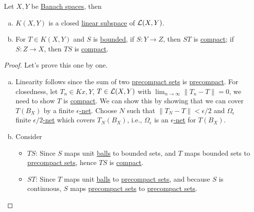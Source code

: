 \begin{proposition}
	Let \(X, Y\) be \hyperref[def:Banach-space]{Banach spaces}, then
	\begin{enumerate}[(a)]
		\item \(K(X, Y)\) is a closed \hyperref[def:linear-vector-space]{linear subspace} of \(\mathcal{\MakeUppercase{l}} (X, Y)\).
		\item For \(T\in K(X, Y)\) and \(S\) is \hyperref[def:bounded-map]{bounded}, if \(S\colon Y\to Z\), then \(ST\) is \hyperref[def:compact-op]{compact}; if \(S\colon Z\to X\), then \(TS\) is \hyperref[def:compact-op]{compact}.
	\end{enumerate}
\end{proposition}
\begin{proof}
	Let's prove this one by one.
	\begin{enumerate}[(a)]
		\item Linearity follows since the sum of two \hyperref[def:precompact]{precompact sets} is \hyperref[def:precompact]{precompact}. For closedness, let \(T_n\in Kx, Y\), \(T\in \mathcal{\MakeUppercase{l}} (X, Y)\) with \(\lim_{n \to \infty} \left\lVert T_n - T\right\rVert = 0\), we need to show \(T\) is \hyperref[def:compact-op]{compact}. We can show this by showing that we can cover \(T(B_X)\) by a finite \hyperref[def:eps-net]{\(\epsilon \)-net}. Choose \(N\) such that \(\left\lVert T_N - T\right\rVert < \epsilon / 2\) and \(\Omega _\epsilon \) finite \hyperref[def:eps-net]{\(\epsilon /2\)-net} which covers \(T_N(B_X)\), i.e., \(\Omega _\epsilon \) is an \hyperref[def:eps-net]{\(\epsilon \)-net} for \(T(B_X)\).
		\item Consider
		      \begin{itemize}
			      \item \(TS\): Since \(S\) maps unit \hyperref[def:ball]{balls} to bounded sets, and \(T\) maps bounded sets to \hyperref[def:precompact]{precompact sets}, hence \(TS\) is \hyperref[def:compact-op]{compact}.
			      \item \(ST\): Since \(T\) maps unit \hyperref[def:ball]{balls} to \hyperref[def:precompact]{precompact sets}, and because \(S\) is continuous, \(S\) maps \hyperref[def:precompact]{precompact sets} to \hyperref[def:precompact]{precompact sets}.
		      \end{itemize}
	\end{enumerate}
\end{proof}